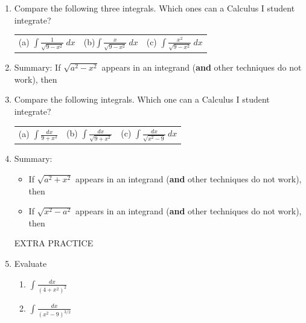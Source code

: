 \documentclass[11pt,fleqn]{article}
\begin{document}
\begin{enumerate}
\begin{tabular}{ccc}
(a) $\d \int \cos(x) \: dx$ &\quad \hspace{.5in} (b) $\d \int \cos^2(x) \: dx$ &\quad \hspace{1in} (c) $\d \int \cos^3(x) \: dx$ \\
\end{tabular}
\newpage
\begin{center} Section 3.3 \end{center}
\item Compare the following three integrals. Which ones can a Calculus I student integrate?\\
	\begin{tabular}{ccc}	
	(a) $\displaystyle{\int \frac{1}{\sqrt{9-x^2}}\: dx}$& \quad \hspace{.5in} (b)$\displaystyle{\int \frac{x}{\sqrt{9-x^2}}\: dx}$ &\quad \hspace{1in} (c) $\displaystyle{\int  \frac{x^2}{\sqrt{9-x^2}}\: dx}$
	\end{tabular}
	\vfill
\item Summary: If {\Large{$\sqrt{a^2-x^2}$}} appears in an integrand (\textbf{and} other techniques do not work), then\\
\vspace{.2in}
\newpage
\item Compare the following integrals. Which one can a Calculus I student integrate?\\
\begin{tabular}{ccc}	
	(a) $\displaystyle{\int \frac{dx}{{9+x^2}}}$&
	\quad \hspace{.5in} (b) $\displaystyle{\int \frac{dx}{\sqrt{9+x^2}}}$&\quad \hspace{.5in} (c)
	$\displaystyle{\int  \frac{dx}{\sqrt{x^2-9}}\: dx}$
	\end{tabular}
	\vfill
\item Summary: 
	\begin{itemize}
	\item If {\Large{$\sqrt{a^2+x^2}$}} appears in an integrand (\textbf{and} other techniques do not work), then\\
	\vspace{.2in}
	\item If {\Large{$\sqrt{x^2-a^2}$}} appears in an integrand (\textbf{and} other techniques do not work), then\\
	\vspace{.2in}
	\end{itemize}
\newpage
\begin{center} EXTRA PRACTICE \end{center}
\item Evaluate 
	\begin{enumerate}
	\item $\displaystyle{\int \frac{dx}{(4+x^2)^2}  }$
	\vfill
	\item $\displaystyle{\int \frac{dx}{(x^2-9)^{3/2}}}$
	\vfill
	\end{enumerate}
	


\end{enumerate}
\end{document}
